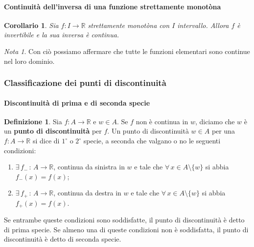 \documentclass{article}
\theoremstyle{plain}
\newtheorem{cor}{Corollario}
\theoremstyle{definition}
\newtheorem{defn}{Definizione}[section]
\theoremstyle{remark}
\newtheorem{note}{Nota}
\begin{document}
\vspace{10pt}

\paragraph{Continuità dell'inversa di una funzione strettamente monotòna}
\begin{bxthm}
\begin{cor}
    Sia $f:I\to\mathbb{R}$ strettamente monotòna con $I$ intervallo.
    Allora $f$ è invertibile e la sua inversa è continua.
\end{cor}
\end{bxthm}

\vspace{10pt}

\begin{note}
    Con ciò possiamo affermare che tutte le funzioni elementari sono continue nel loro dominio.
\end{note}

\vspace{10pt}

\subsubsection{Classificazione dei punti di discontinuità}

\vspace{10pt}

\paragraph{Discontinuità di prima e di seconda specie}
\begin{bxthm}
\begin{defn}
    Sia $f:A\to\mathbb{R}$ e $w\in A$.
    Se $f$ non è continua in $w$, diciamo che $w$ è un \textbf{punto di discontinuità} per $f$.
    Un punto di discontinuità $w\in A$ per una $f:A\to\mathbb{R}$ si dice di $1^\circ$ o $2^\circ$ specie, a seconda che valgano o no le seguenti condizioni:
    \begin{enumerate}
        \item $\exists\, f_-\,:\,A\to\mathbb{R}$, continua da sinistra in $w$ e tale che $\forall\, x\in A\setminus\{w\}$ si abbia $f_-(x)=f(x)$;
        \item $\exists\, f_+\,:\,A\to\mathbb{R}$, continua da destra in $w$ e tale che $\forall\, x\in A\setminus\{w\}$ si abbia $f_+(x)=f(x)$.
    \end{enumerate}
    Se entrambe queste condizioni sono soddisfatte, il punto di discontinuità è detto di prima specie. 
    Se almeno una di queste condizioni non è soddisfatta, il punto di discontinuità è detto di seconda specie.
\end{defn}
\end{bxthm}
\end{document}
